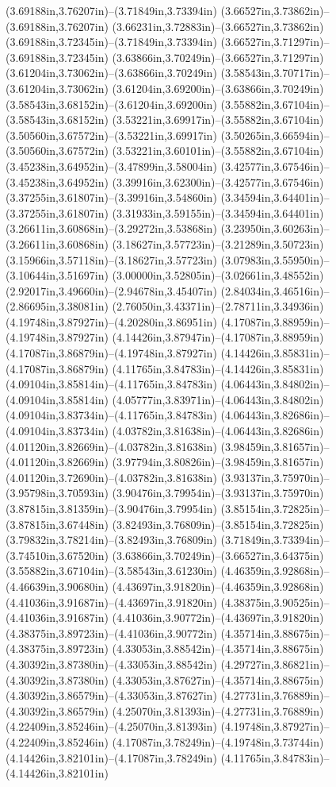 (3.69188in,3.76207in)--(3.71849in,3.73394in) (3.66527in,3.73862in)--(3.69188in,3.76207in) (3.66231in,3.72883in)--(3.66527in,3.73862in) (3.69188in,3.72345in)--(3.71849in,3.73394in) (3.66527in,3.71297in)--(3.69188in,3.72345in) (3.63866in,3.70249in)--(3.66527in,3.71297in) (3.61204in,3.73062in)--(3.63866in,3.70249in) (3.58543in,3.70717in)--(3.61204in,3.73062in) (3.61204in,3.69200in)--(3.63866in,3.70249in) (3.58543in,3.68152in)--(3.61204in,3.69200in) (3.55882in,3.67104in)--(3.58543in,3.68152in) (3.53221in,3.69917in)--(3.55882in,3.67104in) (3.50560in,3.67572in)--(3.53221in,3.69917in) (3.50265in,3.66594in)--(3.50560in,3.67572in) (3.53221in,3.60101in)--(3.55882in,3.67104in) (3.45238in,3.64952in)--(3.47899in,3.58004in) (3.42577in,3.67546in)--(3.45238in,3.64952in) (3.39916in,3.62300in)--(3.42577in,3.67546in) (3.37255in,3.61807in)--(3.39916in,3.54860in) (3.34594in,3.64401in)--(3.37255in,3.61807in) (3.31933in,3.59155in)--(3.34594in,3.64401in) (3.26611in,3.60868in)--(3.29272in,3.53868in) (3.23950in,3.60263in)--(3.26611in,3.60868in) (3.18627in,3.57723in)--(3.21289in,3.50723in) (3.15966in,3.57118in)--(3.18627in,3.57723in) (3.07983in,3.55950in)--(3.10644in,3.51697in) (3.00000in,3.52805in)--(3.02661in,3.48552in) (2.92017in,3.49660in)--(2.94678in,3.45407in) (2.84034in,3.46516in)--(2.86695in,3.38081in) (2.76050in,3.43371in)--(2.78711in,3.34936in) (4.19748in,3.87927in)--(4.20280in,3.86951in) (4.17087in,3.88959in)--(4.19748in,3.87927in) (4.14426in,3.87947in)--(4.17087in,3.88959in) (4.17087in,3.86879in)--(4.19748in,3.87927in) (4.14426in,3.85831in)--(4.17087in,3.86879in) (4.11765in,3.84783in)--(4.14426in,3.85831in) (4.09104in,3.85814in)--(4.11765in,3.84783in) (4.06443in,3.84802in)--(4.09104in,3.85814in) (4.05777in,3.83971in)--(4.06443in,3.84802in) (4.09104in,3.83734in)--(4.11765in,3.84783in) (4.06443in,3.82686in)--(4.09104in,3.83734in) (4.03782in,3.81638in)--(4.06443in,3.82686in) (4.01120in,3.82669in)--(4.03782in,3.81638in) (3.98459in,3.81657in)--(4.01120in,3.82669in) (3.97794in,3.80826in)--(3.98459in,3.81657in) (4.01120in,3.72690in)--(4.03782in,3.81638in) (3.93137in,3.75970in)--(3.95798in,3.70593in) (3.90476in,3.79954in)--(3.93137in,3.75970in) (3.87815in,3.81359in)--(3.90476in,3.79954in) (3.85154in,3.72825in)--(3.87815in,3.67448in) (3.82493in,3.76809in)--(3.85154in,3.72825in) (3.79832in,3.78214in)--(3.82493in,3.76809in) (3.71849in,3.73394in)--(3.74510in,3.67520in) (3.63866in,3.70249in)--(3.66527in,3.64375in) (3.55882in,3.67104in)--(3.58543in,3.61230in) (4.46359in,3.92868in)--(4.46639in,3.90680in) (4.43697in,3.91820in)--(4.46359in,3.92868in) (4.41036in,3.91687in)--(4.43697in,3.91820in) (4.38375in,3.90525in)--(4.41036in,3.91687in) (4.41036in,3.90772in)--(4.43697in,3.91820in) (4.38375in,3.89723in)--(4.41036in,3.90772in) (4.35714in,3.88675in)--(4.38375in,3.89723in) (4.33053in,3.88542in)--(4.35714in,3.88675in) (4.30392in,3.87380in)--(4.33053in,3.88542in) (4.29727in,3.86821in)--(4.30392in,3.87380in) (4.33053in,3.87627in)--(4.35714in,3.88675in) (4.30392in,3.86579in)--(4.33053in,3.87627in) (4.27731in,3.76889in)--(4.30392in,3.86579in) (4.25070in,3.81393in)--(4.27731in,3.76889in) (4.22409in,3.85246in)--(4.25070in,3.81393in) (4.19748in,3.87927in)--(4.22409in,3.85246in) (4.17087in,3.78249in)--(4.19748in,3.73744in) (4.14426in,3.82101in)--(4.17087in,3.78249in) (4.11765in,3.84783in)--(4.14426in,3.82101in) 